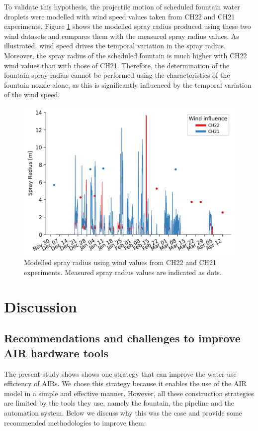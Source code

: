 \documentclass[tc, manuscript]{copernicus}
\begin{document}
To validate this hypothesis, the projectile motion of scheduled fountain water droplets were modelled with wind
speed values taken from CH22 and CH21 experiments. Figure \ref{fig:wind} shows the modelled spray radius
produced using these two wind datasets and compares them with the measured spray radius values. As illustrated,
wind speed drives the temporal variation in the spray radius. Moreover, the spray radius of the scheduled
fountain is much higher with CH22 wind values than with those of CH21. Therefore, the determination of the
fountain spray radius cannot be performed using the characteristics of the fountain nozzle alone, as this is
significantly influenced by the temporal variation of the wind speed.

\begin{figure}[htb]
\includegraphics[width=12 cm]{Figures/radf.png}
\caption{Modelled spray radius using wind values from CH22 and CH21 experiments. Measured spray radius values are
indicated as dots.}
\label{fig:wind}
\end{figure}

\section{Discussion}

\subsection{Recommendations and challenges to improve AIR hardware tools}

The present study shows shows one strategy that can improve the water-use efficiency of AIRs. We chose this
strategy because it enables the use of the AIR model in a simple and effective manner. However, all these
construction strategies are limited by the tools they use, namely the fountain, the pipeline and the automation
system. Below we discuss why this was the case and provide some recommended methodologies to improve them:
\end{document}
